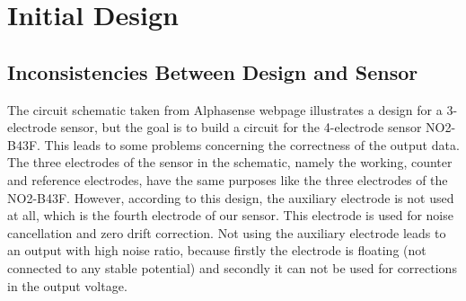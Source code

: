\section{Initial Design}

\subsection{Inconsistencies Between Design and Sensor}
The circuit schematic taken from Alphasense webpage \cite{2009} illustrates a design for a 3-electrode sensor, but the goal is to build a circuit for the 4-electrode sensor NO2-B43F. This leads to some problems concerning the correctness of the output data. The three electrodes of the sensor in the schematic, namely the working, counter and reference electrodes, have the same purposes like the three electrodes of the NO2-B43F. However, according to this design, the auxiliary electrode is not used at all, which is the fourth electrode of our sensor. This electrode is used for noise cancellation and zero drift correction. Not using the auxiliary electrode leads to an output with high noise ratio, because firstly the electrode is floating (not connected to any stable potential) and secondly it can not be used for corrections in the output voltage. 


